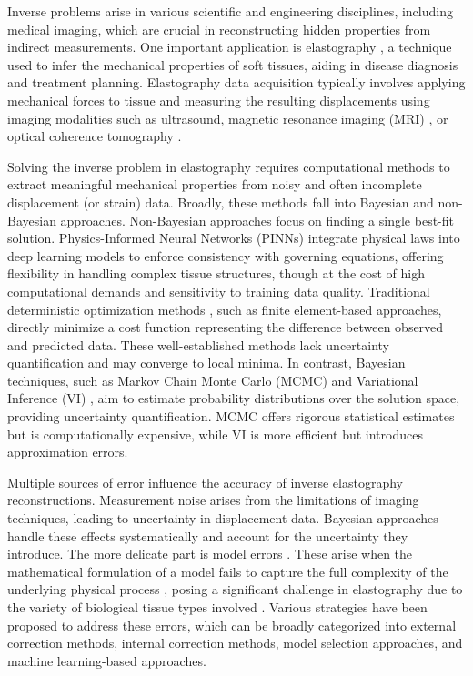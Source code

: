 Inverse problems arise in various scientific and engineering disciplines, including medical imaging, which are crucial in reconstructing hidden properties from indirect measurements. One important application is elastography \cite{ophir1991elastography, doyley2012model}, a technique used to infer the mechanical properties of soft tissues, aiding in disease diagnosis and treatment planning. Elastography data acquisition typically involves applying mechanical forces to tissue and measuring the resulting displacements using imaging modalities such as ultrasound, magnetic resonance imaging (MRI) \cite{muthupillai1995magnetic}, or optical coherence tomography \cite{khalil2005tissue}.

Solving the inverse problem in elastography requires computational methods to extract meaningful mechanical properties from noisy and often incomplete displacement (or strain) data. Broadly, these methods fall into Bayesian and non-Bayesian approaches. 
Non-Bayesian approaches focus on finding a single best-fit solution. Physics-Informed Neural Networks (PINNs) \cite{raissi2019physics} integrate physical laws into deep learning models to enforce consistency with governing equations, offering flexibility in handling complex tissue structures, though at the cost of high computational demands and sensitivity to training data quality. Traditional deterministic optimization methods \cite{vogel2002computational}, such as finite element-based approaches, directly minimize a cost function representing the difference between observed and predicted data. These well-established methods lack uncertainty quantification and may converge to local minima.
In contrast, Bayesian techniques, such as Markov Chain Monte Carlo (MCMC) \cite{green2015bayesian} and Variational Inference (VI) \cite{blei2017variational}, aim to estimate probability distributions over the solution space, providing uncertainty quantification. MCMC offers rigorous statistical estimates but is computationally expensive, while VI is more efficient but introduces approximation errors. 

Multiple sources of error influence the accuracy of inverse elastography reconstructions. Measurement noise arises from the limitations of imaging techniques, leading to uncertainty in displacement data. Bayesian approaches handle these effects systematically and account for the uncertainty they introduce. The more delicate part is model errors \cite{brynjarsdottir2014learning}. These arise when the mathematical formulation of a model fails to capture the full complexity of the underlying physical process \cite{kaipio2006statistical}, posing a significant challenge in elastography due to the variety of biological tissue types involved \cite{holzapfel2017similarities}. Various strategies have been proposed to address these errors, which can be broadly categorized into external correction methods, internal correction methods, model selection approaches, and machine learning-based approaches. 


